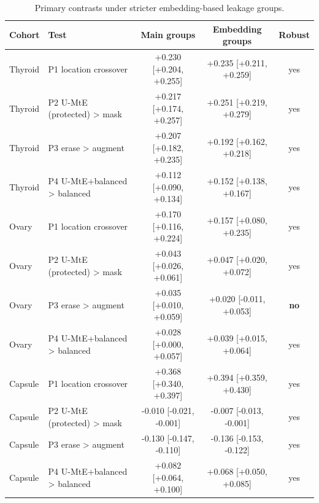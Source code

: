 \begin{table}[H]\centering\scriptsize
\caption{Primary contrasts under stricter embedding-based leakage groups.}\label{tab:emb}
\begin{tabular}{llccc}\toprule
Cohort & Test & Main groups & Embedding groups & Robust \\\midrule
Thyroid & P1 location crossover & +0.230 [+0.204, +0.255] & +0.235 [+0.211, +0.259] & yes \\
Thyroid & P2 U-MtE (protected) > mask & +0.217 [+0.174, +0.257] & +0.251 [+0.219, +0.279] & yes \\
Thyroid & P3 erase > augment & +0.207 [+0.182, +0.235] & +0.192 [+0.162, +0.218] & yes \\
Thyroid & P4 U-MtE+balanced > balanced & +0.112 [+0.090, +0.134] & +0.152 [+0.138, +0.167] & yes \\
Ovary & P1 location crossover & +0.170 [+0.116, +0.224] & +0.157 [+0.080, +0.235] & yes \\
Ovary & P2 U-MtE (protected) > mask & +0.043 [+0.026, +0.061] & +0.047 [+0.020, +0.072] & yes \\
Ovary & P3 erase > augment & +0.035 [+0.010, +0.059] & +0.020 [-0.011, +0.053] & \textbf{no} \\
Ovary & P4 U-MtE+balanced > balanced & +0.028 [+0.000, +0.057] & +0.039 [+0.015, +0.064] & yes \\
Capsule & P1 location crossover & +0.368 [+0.340, +0.397] & +0.394 [+0.359, +0.430] & yes \\
Capsule & P2 U-MtE (protected) > mask & -0.010 [-0.021, -0.001] & -0.007 [-0.013, -0.001] & yes \\
Capsule & P3 erase > augment & -0.130 [-0.147, -0.110] & -0.136 [-0.153, -0.122] & yes \\
Capsule & P4 U-MtE+balanced > balanced & +0.082 [+0.064, +0.100] & +0.068 [+0.050, +0.085] & yes \\
\bottomrule\end{tabular}\end{table}
